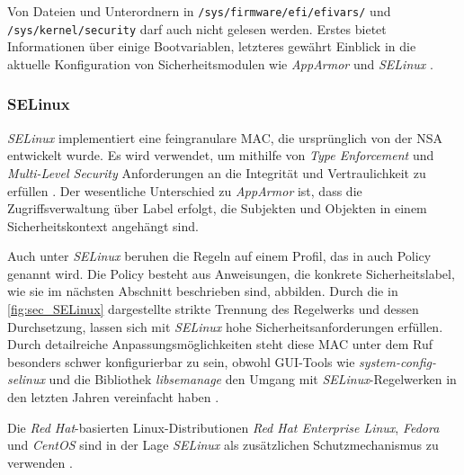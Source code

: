 \documentclass[../main.tex]{subfiles}
\begin{document}
				Von Dateien und Unterordnern in \texttt{/sys/firmware/efi/efivars/} und \texttt{/sys/kernel/security} darf auch nicht gelesen werden. Erstes bietet Informationen über einige Bootvariablen, letzteres gewährt Einblick in die aktuelle Konfiguration von Sicherheitsmodulen wie \emph{AppArmor} und \emph{SELinux} \cite{apparmorEFI}\cite{apparmorSecurityFS}\cite{apparmorLWNSecurityFS}.

  		\subsubsection{\acrshort{SELinux}}
				\emph{SELinux} implementiert eine feingranulare MAC, die ursprünglich von der NSA entwickelt wurde. Es wird verwendet, um mithilfe von \emph{Type Enforcement} und \emph{Multi-Level Security} Anforderungen an die Integrität und Vertraulichkeit zu erfüllen \cite{redhatSec}. %
				Der wesentliche Unterschied zu \emph{AppArmor} ist, dass die Zugriffsverwaltung über Label erfolgt, die Subjekten und Objekten in einem Sicherheitskontext angehängt sind.


				Auch unter \emph{SELinux} beruhen die Regeln auf einem Profil, das in auch Policy genannt wird. Die Policy besteht aus Anweisungen, die konkrete Sicherheitslabel, wie sie im nächsten Abschnitt beschrieben sind, abbilden. Durch die in \fig \ref{fig:sec_SELinux} dargestellte strikte Trennung des Regelwerks und dessen Durchsetzung, lassen sich mit \emph{SELinux} hohe Sicherheitsanforderungen erfüllen. Durch detailreiche Anpassungsmöglichkeiten steht diese MAC unter dem Ruf besonders schwer konfigurierbar zu sein, obwohl GUI-Tools wie \emph{system-config-selinux} und die Bibliothek \emph{libsemanage} den Umgang mit \emph{SELinux}-Regelwerken in den letzten Jahren vereinfacht haben \cite[S.62,S.67]{linuxMagazineSec}.

				Die \emph{Red Hat}-basierten Linux-Distributionen \emph{Red Hat Enterprise Linux}, \emph{Fedora} und \emph{CentOS} sind in der Lage \emph{SELinux} als zusätzlichen Schutzmechanismus zu verwenden \cite{dockerSecurity}.
\end{document}
